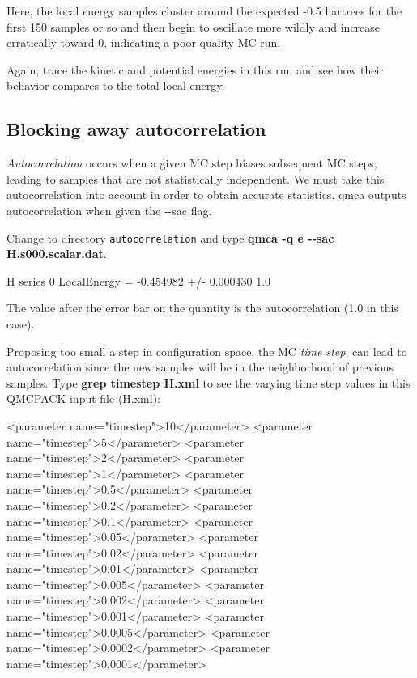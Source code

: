 
Here, the local energy samples cluster around the expected -0.5 hartrees for the
first 150 samples or so and then begin to oscillate more wildly and increase
erratically toward 0, indicating a poor quality MC run.

Again, trace the kinetic and potential energies in this run and see how their
behavior compares to the total local energy.

\subsection{Blocking away autocorrelation}

\textit{Autocorrelation} occurs when a given MC step biases subsequent MC
steps, leading to samples that are not statistically independent.  We must take
this autocorrelation into account in order to obtain accurate statistics.  qmca
outputs autocorrelation when given the {-}{-}sac flag.

Change to directory \texttt{autocorrelation} and type \textbf{qmca -q e
{-}{-}sac H.s000.scalar.dat}.  

\begin{shade} 
H  series 0  LocalEnergy = -0.454982 +/- 0.000430    1.0 
\end{shade}

The value after the error bar on the quantity is the autocorrelation (1.0 in
this case).

Proposing too small a step in configuration space, the MC \textit{time step},
can lead to autocorrelation since the new samples will be in the neighborhood
of previous samples.  Type \textbf{grep timestep H.xml} to see the varying time
step values in this QMCPACK input file (H.xml):

\begin{shade} 
<parameter name="timestep">10</parameter>
<parameter name="timestep">5</parameter> 
<parameter name="timestep">2</parameter> 
<parameter name="timestep">1</parameter>
<parameter name="timestep">0.5</parameter> 
<parameter name="timestep">0.2</parameter> 
<parameter name="timestep">0.1</parameter>
<parameter name="timestep">0.05</parameter> 
<parameter name="timestep">0.02</parameter> 
<parameter name="timestep">0.01</parameter>
<parameter name="timestep">0.005</parameter> 
<parameter name="timestep">0.002</parameter> 
<parameter name="timestep">0.001</parameter>
<parameter name="timestep">0.0005</parameter> 
<parameter name="timestep">0.0002</parameter> 
<parameter name="timestep">0.0001</parameter> 
\end{shade}

